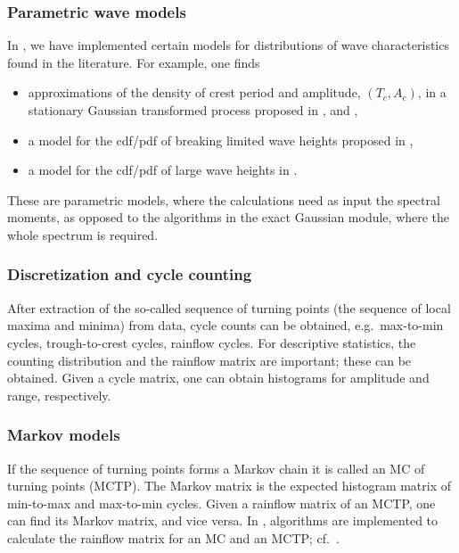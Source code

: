 \subsubsection{Parametric wave models}
In \progname{}, we have implemented cer\-tain models for distributions
of wave characteristics found in the literature. For example,
one finds
\begin{itemize}\setlength\itemsep{-1mm}
   \item approximations of the density of crest period and amplitude,
     $(T_c,A_c)$, in a
   stationary Gaussian transformed process proposed in
   \cite{CavanieEtal1976Statistical},
   and \cite{Longuet-Higgins1983Joint},%
   \item a model for the cdf/pdf of breaking limited wave
   heights proposed in \cite{Tayfun1981Breaking},%
   \item a model for the cdf/pdf of large wave heights
   in \cite{Tayfun1990Distribution}.%
\end{itemize}
These are parametric models, where the calculations need as input the spectral 
moments, as opposed to the algorithms in the
exact Gaussian module, where the whole spectrum is required. %

\subsubsection{Discretization and cycle counting}
After extraction of the so-called sequence of turning points
(the sequence of local maxima and minima) from data, cycle
counts can be obtained, e.g.~max-to-min cycles, trough-to-crest cycles,
rainflow cycles. For descriptive statistics, the counting
distribution and the rainflow matrix are important; these can
be obtained. Given a cycle matrix, one can obtain histograms for
amplitude and range, respectively. %

\subsubsection{Markov models}
If the sequence of turning points forms a Markov chain it
is called an MC of turning points (MCTP).
The Markov matrix is the expected histogram matrix of min-to-max
and max-to-min cycles. Given a rainflow matrix of an MCTP, one can
find its Markov matrix, and vice versa.
In \progname{}, algorithms are implemented to
calculate the rainflow matrix for an MC and an MCTP;
cf.\ \cite{FrendahlAndRychlik1993Rainflow}.

